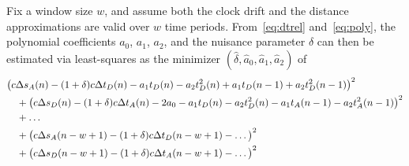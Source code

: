 \documentclass[12pt,journal,final,onecolumn]{IEEEtran}
\theoremstyle{definition}
\theoremstyle{myremark}
\newcommand{\dtd}{\Delta t_D}
\newcommand{\dta}{\Delta t_A}
\newcommand{\dsd}{\Delta s_D}
\newcommand{\dsa}{\Delta s_A}
\begin{document}
Fix a window size $w$, and assume both the clock drift and the distance
approximations are valid over $w$ time periods. From~\eqref{eq:dtrel}
and~\eqref{eq:poly}, the polynomial coefficients $a_0$, $a_1$, $a_2$, and the
nuisance parameter $\delta$ can then be estimated via least-squares as the
minimizer $(\hat{\delta}, \hat{a}_0, \hat{a}_1, \hat{a}_2)$ of
\begin{align*}
    & \bigl(c\dsa(n)-(1+\delta)c\dtd(n)
    -a_1t_D(n)-a_2t_D^2(n)+a_1t_D(n-1)+a_2t_D^2(n-1)\bigr)^2 \notag \\
    & \quad {} + \bigl(c\dsd(n)-(1+\delta)c\dta(n)
    -2a_0-a_1t_D(n)-a_2t_D^2(n)-a_1t_A(n-1)-a_2t_A^2(n-1)\bigr)^2 \notag \\
    & \quad {} + \dots \notag \\
    & \quad {} + \bigl(c\dsa(n-w+1)-(1+\delta)c\dtd(n-w+1)-\dots\bigr)^2 \notag \\
    & \quad {} + \bigl(c\dsd(n-w+1)-(1+\delta)c\dta(n-w+1)-\dots\bigr)^2
\end{align*}
\end{document}
